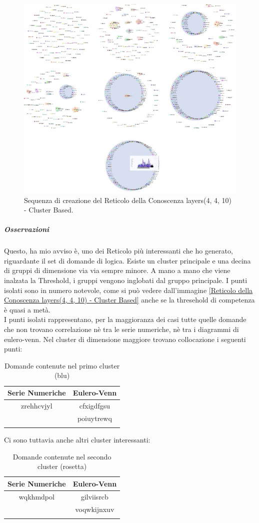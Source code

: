 \begin{figure}[H]
\centering
	\includegraphics[width=0.70\linewidth]{./image/collage_reticolo-logica(4,4,10).png}
	\caption{Sequenza di creazione del Reticolo della Conoscenza layers(4, 4, 10) - Cluster Based.}
	\label{Sequenza di creazione del Reticolo della Conoscenza layers(4, 4, 10) - Cluster Based.}
\end{figure}
\noindent

\subparagraph{Osservazioni}\mbox{}
\noindent
Questo, ha mio avviso \`e, uno dei Reticolo pi\`u interessanti che ho generato, riguardante il set di domande di logica.
Esiste un cluster principale e una decina di gruppi di dimensione via via sempre minore. A mano a mano che viene inalzata la Threshold, i gruppi vengono inglobati dal gruppo principale. I punti isolati sono in numero notevole, come si pu\`o vedere dall'immagine \ref{Reticolo della Conoscenza layers(4, 4, 10) - Cluster Based} anche se la thresehold di competenza \`e quasi a met\`a.\\
I punti isolati rappresentano, per la maggioranza dei casi tutte quelle domande che non trovano correlazione n\`e tra le serie numeriche, n\`e tra i diagrammi di eulero-venn. Nel cluster di dimensione maggiore trovano collocazione i seguenti punti:
\begin{longtable}{|c|c|}
	\hline
	\textbf{Serie Numeriche} & \textbf{Eulero-Venn} \\\hline\hline
	zrehhcvjyl & cfxigdfgsu \\
	           & poiuytrewq \\
	
\hline
\caption{Domande contenute nel primo cluster (blu)}\label{tab:Domande contenute nel primo cluster}
\end{longtable}
\noindent
Ci sono tuttavia anche altri cluster interessanti:
\begin{longtable}{|c|c|}
	\hline
	\textbf{Serie Numeriche} & \textbf{Eulero-Venn} \\\hline\hline
	wqkhmdpol & gilviisrcb \\
	           & voqwkijnxuv\\
	
\hline
\caption{Domande contenute nel secondo cluster (rosetta)}\label{tab:Domande contenute nel secondo cluster}
\end{longtable}
\noindent

